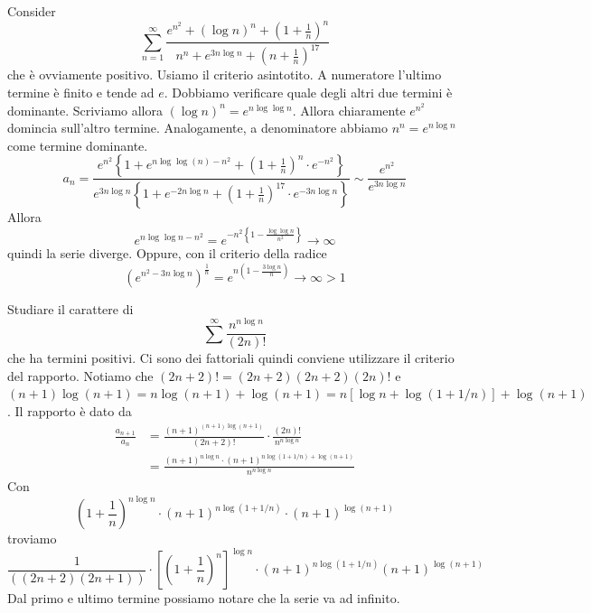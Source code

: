 \documentclass[a4paper]{article}
\begin{document}
\begin{snippetexample}{}
    Consider
    \[
        \sum_{n=1}^\infty \frac{e^{n^2} + {(\log n)}^n + {\left(1 + \frac{1}{n}\right)}^n}{n^n + e^{3n\log n} + {\left(n+\frac{1}{n}\right)}^{17}}
    \]
    che è ovviamente positivo.
    Usiamo il criterio asintotito.
    A numeratore l'ultimo termine è finito e tende ad \(e\).
    Dobbiamo verificare quale degli altri due termini è dominante.
    Scriviamo allora \({(\log n)}^n = e^{n\log\log n}\).
    Allora chiaramente \(e^{n^2}\) domincia sull'altro termine.
    Analogamente, a denominatore abbiamo \(n^n = e^{n\log n}\)
    come termine dominante.
    \[
        a_n =  \frac{
            e^{n^2} \left\{
            1 + e^{n\log \log(n) - n^2}
            + {\left(1 + \frac{1}{n}\right)}^{n} \cdot e^{-n^2}
        \right\}
        }{
            e^{3n\log n} \left\{
                1 + e^{-2n\log n} + {\left(1 + \frac{1}{n}\right)}^{17}
                \cdot e^{-3n\log n}
            \right\}
        } \sim \frac{e^{n^2}}{e^{3n\log n}}
    \]
    Allora
    \[
        e^{n\log \log n - n^2} = e^{-n^2 \left\{1 - \frac{\log\log n}{n^2}\right\}}
        \to \infty
    \]
    quindi la serie diverge.
    Oppure, con il criterio della radice
    \[
        {\left(e^{n^2 - 3n \log n}\right)}^{\frac{1}{n}}
        = e^{n\left(1 - \frac{3\log n}{n}\right)} \to \infty > 1
    \]
\end{snippetexample}

\begin{snippetexample}{}
    Studiare il carattere di
    \[
        \sum^\infty \frac{
            n^{n\log n}
        }{
            (2n)!
        }
    \]
    che ha termini positivi. Ci sono dei fattoriali quindi conviene utilizzare il criterio
    del rapporto.
    Notiamo che \((2n+2)! = (2n+2)(2n+2)(2n)!\)
    e \((n+1)\log(n+1) = n\log(n+1) + \log(n+1) = n[\log n + \log(1 + 1/n)] + \log(n+1)\).
    Il rapporto è dato da\begin{align*}
        \frac{a_{n+1}}{a_n} &= \frac{
            {(n+1)}^{(n+1)\log(n+1)}
        }{
            (2n+2)!
        }
        \cdot
        \frac{
            (2n)!
        }{
            n^{n\log n}
        } \\
        &= \frac{
            {(n+1)}^{n\log n} \cdot {(n+1)}^{n\log(1 + 1/n) + \log(n+1)}
        }{
            n^{n\log n}
        }
    \end{align*}
    Con
    \[
        {\left(1 + \frac{1}{n}\right)}^{n\log n}
        \cdot {(n+1)}^{n\log(1 + 1/n)}
        \cdot {(n+1)}^{\log (n+1)}
    \]
    troviamo
    \[
        \frac{1}{((2n+2)(2n+1))} \cdot {\left[
            {\left(1 + \frac{1}{n}\right)}^n
        \right]}^{\log n}
        \cdot {(n+1)}^{n\log (1 + 1/n)}{(n+1)}^{\log(n+1)}
    \]
    Dal primo e ultimo termine possiamo notare che la serie va ad infinito.
\end{snippetexample}
\end{document}
